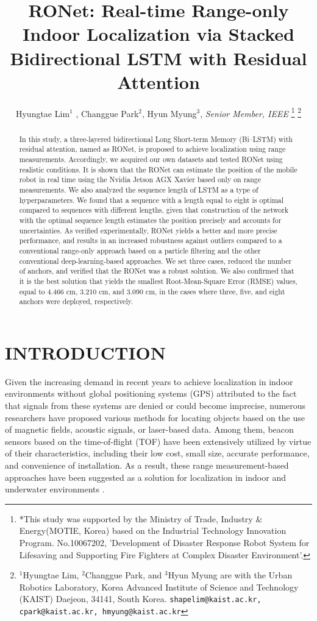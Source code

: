 \documentclass[letterpaper, 10 pt, conference]{ieeeconf}
\title{\LARGE \bf
RONet: Real-time Range-only Indoor Localization via Stacked Bidirectional LSTM with Residual Attention}
\author{Hyungtae Lim$^{1}$ , Changgue Park$^{2}$, Hyun Myung$^{3}$, \textit{Senior Member, IEEE}%
\thanks{
	*This study was supported by the Ministry of Trade, Industry \& Energy(MOTIE, Korea) based on the Industrial Technology Innovation Program. No.10067202, 'Development of Disaster Response Robot System for Lifesaving and Supporting Fire Fighters at Complex Disaster Environment'.}%
\thanks{$^{1}$Hyungtae Lim, $^{2}$Changgue Park, and $^{3}$Hyun Myung are with
	the Urban Robotics Laboratory, Korea Advanced Institute of Science
	and Technology (KAIST) Daejeon, 34141, South Korea. {\tt\small shapelim@kaist.ac.kr, cpark@kaist.ac.kr, hmyung@kaist.ac.kr}}%
%
}
\begin{document}

\maketitle
\thispagestyle{empty}
\pagestyle{empty}

\begin{abstract}

In this study, a three-layered bidirectional Long Short-term Memory (Bi--LSTM) with residual attention, named as RONet, is proposed to achieve localization using range measurements. Accordingly, we acquired our own datasets and tested RONet using realistic conditions. It is shown that the RONet can estimate the position of the mobile robot in real time using the Nvidia Jetson AGX Xavier based only on range measurements. We also analyzed the sequence length of LSTM as a type of hyperparameters. We found that a sequence with a length equal to eight is optimal compared to sequences with different lengths, given that construction of the network with the optimal sequence length estimates the position precisely and accounts for uncertainties. As verified experimentally, RONet yields a better and more precise performance, and results in an increased robustness against outliers compared to a conventional range-only approach based on a particle filtering and the other conventional deep-learning-based approaches. We set three cases, reduced the number of anchors, and verified that the RONet was a robust solution. We also confirmed that it is the best solution that yields the smallest Root-Mean-Square Error (RMSE) values, equal to 4.466 cm, 3.210 cm, and 3.090 cm, in the cases where three, five, and eight anchors were deployed, respectively.   

\end{abstract}

\section{INTRODUCTION}

Given the increasing demand in recent years to achieve localization in indoor environments without global positioning systems (GPS) attributed to the fact that signals from these systems are denied or could become imprecise, numerous researchers have proposed various methods for locating objects based on the use of magnetic fields, acoustic signals, or laser-based data\cite{jung2015magnetic,medina2013ultrasound,li2014lidar}. Among them, beacon sensors based on the time-of-flight (TOF) have been extensively utilized by virtue of their characteristics, including their low cost, small size, accurate performance, and convenience of installation. As a result, these range measurement-based approaches have been suggested as a solution for localization in indoor \cite{peneda2009trilateration,jung2011indoor} and underwater environments \cite{newman2003pure, olson2006robust}.
\end{document}
